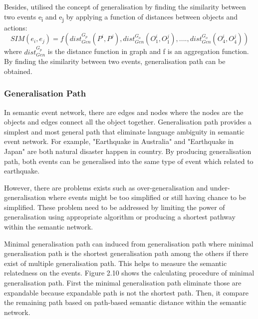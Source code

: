 \documentclass[twoside]{utmthesis}
\begin{document}
Besides, \cite{radinsky2012learning} utilised the concept of generalisation by finding the similarity between two events e\textsubscript{i} and e\textsubscript{j} by applying a function of distances between objects and actions: 
\begin{equation}\label{2.1}
SIM(e_{i},e_{j}) = f(dist_{Gen}^{G_{p}}(P^{i},P^{j}),dist_{Gen}^{G_{o}}(O_{1}^{i},O_{1}^{j}),....,dist_{Gen}^{G_{o}}(O_{4}^{i},O_{4}^{j}))
\end{equation} 
where $dist_{Gen}^{G_{p}}$ is the distance function in graph and f is an aggregation function. By finding the similarity between two events, generalisation path can be obtained.  


\subsubsection{Generalisation Path}
In semantic event network, there are edges and nodes where the nodes are the objects and edges connect all the object together.  Generalisation path provides a simplest and most general path that eliminate language ambiguity in semantic event network. For example, "Earthquake in Australia" and "Earthquake in Japan" are both natural disaster happen in country. By producing generalisation path, both events can be generalised into the same type of event which related to earthquake.

However, there are problems exists such as over-generalisation and under-generalisation where events might be too simplified or still having chance to be simplified. These problem need to be addressed by limiting the power of generalisation using appropriate algorithm or producing a shortest pathway within the semantic network. 

Minimal generalisation path can induced from generalisation path where minimal generalisation path is the shortest generalisation path among the others if there exist of multiple generalisation path. This helps to measure the semantic relatedness on the events. Figure 2.10 shows the calculating procedure of minimal generalisation path. First the minimal generalisation path eliminate those are expandable because expandable path is not the shortest path. Then, it compare the remaining path based on path-based semantic distance within the semantic network. 
 
\end{document}
